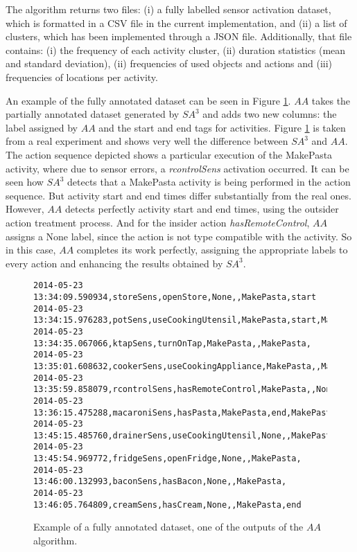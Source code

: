 The algorithm returns two files: (i) a fully labelled sensor activation dataset, which is formatted in a CSV file in the current implementation, and (ii) a list of clusters, which has been implemented through a JSON file. Additionally, that file contains: (i) the frequency of each activity cluster, (ii) duration statistics (mean and standard deviation), (ii) frequencies of used objects and actions and (iii) frequencies of locations per activity. 

An example of the fully annotated dataset can be seen in Figure \ref{fig-fully-annotated}. $AA$ takes the partially annotated dataset generated by $SA^3$ and adds two new columns: the label assigned by $AA$ and the start and end tags for activities. Figure \ref{fig-fully-annotated} is taken from a real experiment and shows very well the difference between $SA^3$ and $AA$. The action sequence depicted shows a particular execution of the MakePasta activity, where due to sensor errors, a \textit{rcontrolSens} activation occurred. It can be seen how $SA^3$ detects that a MakePasta activity is being performed in the action sequence. But activity start and end times differ substantially from the real ones. However, $AA$ detects perfectly activity start and end times, using the outsider action treatment process. And for the insider action \textit{hasRemoteControl}, $AA$ assigns a None label, since the action is not type compatible with the activity. So in this case, $AA$ completes its work perfectly, assigning the appropriate labels to every action and enhancing the results obtained by $SA^3$.

\begin{figure}[htbp]
\begin{scriptsize}
\begin{lstlisting}
2014-05-23 13:34:09.590934,storeSens,openStore,None,,MakePasta,start
2014-05-23 13:34:15.976283,potSens,useCookingUtensil,MakePasta,start,MakePasta,
2014-05-23 13:34:35.067066,ktapSens,turnOnTap,MakePasta,,MakePasta,
2014-05-23 13:35:01.608632,cookerSens,useCookingAppliance,MakePasta,,MakePasta,
2014-05-23 13:35:59.858079,rcontrolSens,hasRemoteControl,MakePasta,,None,
2014-05-23 13:36:15.475288,macaroniSens,hasPasta,MakePasta,end,MakePasta,
2014-05-23 13:45:15.485760,drainerSens,useCookingUtensil,None,,MakePasta,
2014-05-23 13:45:54.969772,fridgeSens,openFridge,None,,MakePasta,
2014-05-23 13:46:00.132993,baconSens,hasBacon,None,,MakePasta,
2014-05-23 13:46:05.764809,creamSens,hasCream,None,,MakePasta,end
\end{lstlisting}
\end{scriptsize}
\caption{Example of a fully annotated dataset, one of the outputs of the $AA$ algorithm.}
\label{fig-fully-annotated}
\end{figure}

